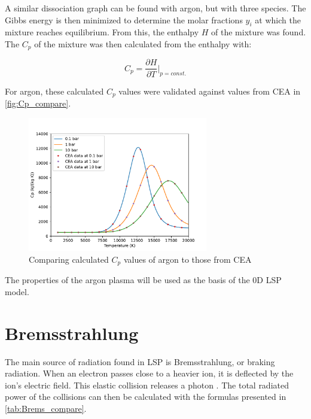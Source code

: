         A similar dissociation graph can be found with argon, but with three species. The Gibbs energy is then minimized to determine the molar fractions $y_i$ at which the mixture reaches equilibrium. From this, the enthalpy $H$ of the mixture was found. The $C_p$ of the mixture was then calculated from the enthalpy with:

        \begin{equation}
            C_p = \frac{\partial H}{\partial T}\bigg|_{p = const.}
        \end{equation}
        
        For argon, these calculated $C_p$ values were validated against values from CEA \cite{CEARUNRev4} in \autoref{fig:Cp_compare}.
        
        \begin{figure}[!ht]
            \centering
            \includegraphics[width=0.7\textwidth]{assets/2 models/Cp_compare.pdf}
            \caption{Comparing calculated $C_p$ values of argon to those from CEA}
            \label{fig:Cp_compare}
        \end{figure}

        The properties of the argon plasma will be used as the basis of the 0D LSP model.
    
    \section{Bremsstrahlung}
        
        The main source of radiation found in LSP is Bremsstrahlung, or braking radiation. When an electron passes close to a heavier ion, it is deflected by the ion's electric field. This elastic collision releases a photon . The total radiated power of the collisions can then be calculated with the formulas presented in \autoref{tab:Brems_compare}.

